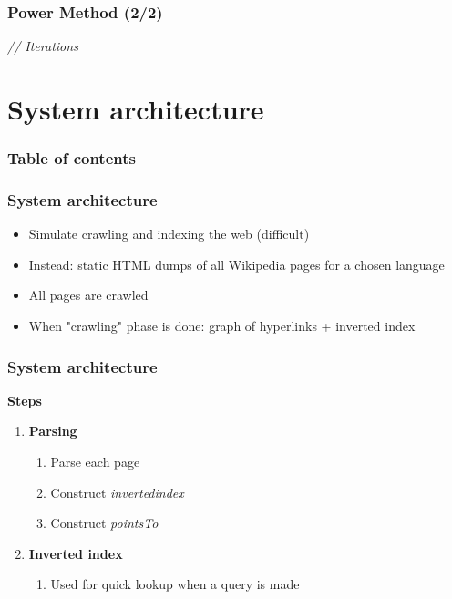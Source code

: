 \documentclass[10pt]{beamer}
\begin{document}
\begin{frame}
  \frametitle{Power Method (2/2)}
  \IncMargin{1em}
  \begin{algorithm}[H]
    \emph{// Iterations}\;
    \BlankLine
  \end{algorithm}
  \DecMargin{1em}
\end{frame}



\section{System architecture}

\begin{frame}
  \frametitle{Table of contents}
  \tableofcontents[currentsection]
\end{frame}

\begin{frame}
  \frametitle{System architecture}
  \begin{itemize}
    \item Simulate crawling and indexing the web (difficult)
    \item Instead: static HTML dumps of all Wikipedia pages for a chosen language
    \item All pages are crawled
    \item When "crawling" phase is done: graph of hyperlinks + inverted index
  \end{itemize}
\end{frame}

\begin{frame}
  \frametitle{System architecture}
  \textbf{Steps}
  \begin{enumerate}
    \item \textbf{Parsing}
      \begin{enumerate}
        \item Parse each page
        \item Construct \emph{invertedindex}
        \item Construct \emph{pointsTo}
      \end{enumerate}
    \item \textbf{Inverted index}
      \begin{enumerate}
        \item Used for quick lookup when a query is made
      \end{enumerate}
  \end{enumerate}
\end{frame}
\end{document}
